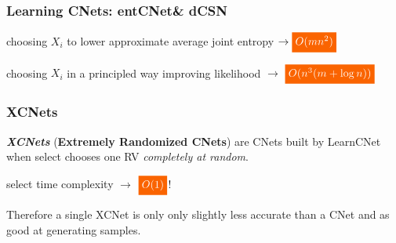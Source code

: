 \documentclass[xcolor={usenames,dvipsnames,svgnames}, compress]{beamer}
\newcommand{\highlight}[2][yellow]{\mathchoice%
  {\colorbox{#1}{\strut\textcolor{white}{$\displaystyle{#2}$}}}%
  {\colorbox{#1}{\strut\textcolor{white}{$\textstyle{#2}$}}}%
  {\colorbox{#1}{\strut\textcolor{white}{$\scriptstyle{#2}$}}}%
  {\colorbox{#1}{\strut\textcolor{white}{$\scriptscriptstyle{#2}$}}}}%
\begin{document}
\begin{frame}
  \frametitle{Learning CNets: entCNet\& dCSN}
  \small

  \begin{center}
      \begin{minipage}{0.9\linewidth}
        \begin{description}[align=parright]
        \item[\textbf{\textsf{entCNet}}~\cite{Rahman2014}] choosing
          $X_{i}$ to lower approximate average joint entropy
          {\hfill $\rightarrow\highlight[gold4]{O(mn^2)}$}
        \item[\textbf{\textsf{dCSN}}~\cite{DiMauro2015a}] choosing
          $X_{i}$ in a principled way improving likelihood
          {\hfill $\rightarrow$ $\highlight[gold4]{O(n^3(m + \log n))}$}
        \end{description}
      \end{minipage}
    \end{center}
\end{frame}

\begin{frame}[t]
  \frametitle{XCNets}
\small
  \emph{\textbf{XCNets}} (\textbf{Extremely Randomized CNets}) are CNets built by \textsf{LearnCNet} when
    \textsf{select} chooses one RV \emph{completely at random}.\par
    {\hfill\textsf{select} time complexity $\rightarrow$ $\highlight[gold4]{O(1)}$!}
    \vspace{20pt}

    Therefore a single \textsf{XCNet} is only only slightly less accurate
than a \textsf{CNet} and as good at generating samples.
\end{frame}
\end{document}
